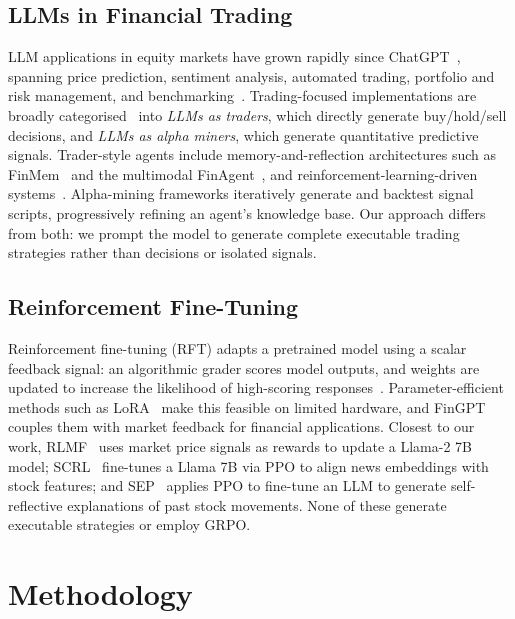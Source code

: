 \documentclass[conference,a4paper]{IEEEtran}
\begin{document}
\subsection{LLMs in Financial Trading}
LLM applications in equity markets have grown rapidly since
ChatGPT~\cite{achiam2023gpt4}, spanning price prediction, sentiment analysis, automated
trading, portfolio and risk management, and benchmarking~\cite{jadhav2025llmequity}. Trading-focused implementations are broadly
categorised~\cite{ding2024survey} into \emph{LLMs as traders}, which directly generate
buy/hold/sell decisions, and \emph{LLMs as alpha miners}, which generate quantitative
predictive signals. Trader-style agents include memory-and-reflection architectures such
as FinMem~\cite{yu2023finmem} and the multimodal FinAgent~\cite{zhang2024finagent}, and
reinforcement-learning-driven systems~\cite{koa2024explainable,ding2023}. Alpha-mining
frameworks \cite{wang2024quantagent,wang2023alphagpt} iteratively generate and backtest
signal scripts, progressively refining an agent's knowledge base. Our approach differs
from both: we prompt the model to generate complete executable trading strategies rather
than decisions or isolated signals.

\subsection{Reinforcement Fine-Tuning}
Reinforcement fine-tuning (RFT) adapts a pretrained model using a scalar feedback signal:
an algorithmic grader scores model outputs, and weights are updated to increase the
likelihood of high-scoring responses~\cite{openai2024rft}. Parameter-efficient methods
such as LoRA~\cite{hu2021lora} make this feasible on limited hardware, and
FinGPT~\cite{liu2023fingpt} couples them with market feedback for financial applications.
Closest to our work,
RLMF~\cite{saqur2024} uses market price signals as rewards to update a Llama-2 7B model;
SCRL~\cite{ding2023} fine-tunes a Llama 7B via PPO to align news embeddings with stock
features; and SEP~\cite{koa2024explainable} applies PPO to fine-tune an LLM to generate
self-reflective explanations of past stock movements. None of these generate executable
strategies or employ GRPO.

\section{Methodology}
\label{ch:method}
\end{document}
